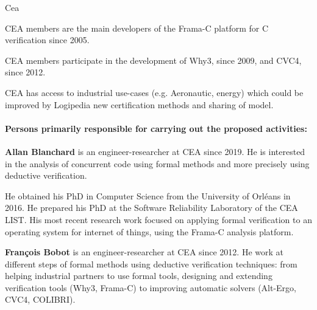 \begin{sitedescription}{Cea}
\begin{compactitem}
\item CEA members are the main developers of the Frama-C platform for C verification
  since 2005.
\item CEA members participate in the development of Why3, since 2009, and CVC4, since 2012.
\item CEA has access to industrial use-cases (e.g. Aeronautic, energy) which could be improved by
  Logipedia new certification methods and sharing of model.
\end{compactitem}

\paragraph*{Persons primarily responsible for carrying out the proposed activities:}

\begin{compactitem} %

\item{\bf Allan Blanchard} is an engineer-researcher at CEA since 2019. He is
  interested in the analysis of concurrent code using formal methods and more
  precisely using deductive verification.

  He obtained his PhD in Computer Science from the University of Orléans in
  2016. He prepared his PhD at the Software Reliability Laboratory of the CEA
  LIST. His most recent research work focused on applying formal verification to
  an operating system for internet of things, using the Frama-C analysis
  platform.

\item{\bf François Bobot} is an engineer-researcher at CEA since 2012. He work
  at different steps of formal methods using deductive verification techniques:
  from helping industrial partners to use formal tools, designing and extending
  verification tools (Why3, Frama-C) to improving automatic solvers (Alt-Ergo,
  CVC4, COLIBRI).
\end{compactitem}

\end{sitedescription}

